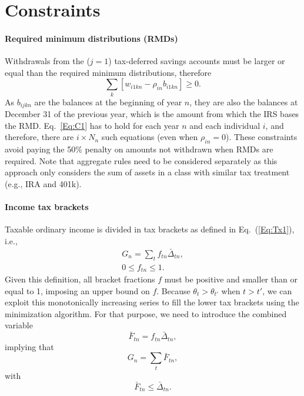 \documentclass{article}[fleqn,12pt]
\begin{document}
\section{Constraints}
\paragraph*{Required minimum distributions (RMDs)}
	Withdrawals from the ($j=1$) tax-deferred savings accounts must be larger
	or equal than the required minimum distributions, therefore
	\begin{equation}
		\label{Eq:C1}
		\sum_k [w_{i1kn} -  \rho_{in}b_{i1kn}] \geq 0.
	\end{equation}
	As $b_{ijkn}$ are the balances at the beginning of year $n$, they are also the balances
	at December 31 of the previous year, which is the amount from which the IRS bases the RMD.
	Eq.~\ref{Eq:C1} has to hold for each year $n$ and each individual $i$, and therefore, there
	are $i\times N_n$ such equations (even when $\rho_{in} = 0$).
	These constraints avoid paying the 50\% penalty
	on amounts not withdrawn when RMDs are required.
	Note that aggregate rules need to be considered separately as this approach only considers
	the sum of assets in a class with similar tax treatment (e.g., IRA and 401k).

\paragraph*{Income tax brackets}
	Taxable ordinary income is divided in tax brackets as defined in Eq.~(\ref{Eq:Tx1}), i.e.,
	\begin{eqnarray}
		\label{Eq:C2}
		G_n = \sum_t f_{tn}\bar{\Delta}_{tn} ,\nonumber\\
		0 \leq f_{tn} \leq 1.
	\end{eqnarray}
	Given this definition, all bracket fractions $f$ must be positive and smaller than or equal to 1,
	imposing an upper bound on $f$.
	Because $\theta_{t} > \theta_{t'}$ when $t > t'$, we can exploit
	this monotonically increasing series to fill the lower
	tax brackets using the minimization algorithm.
	For that purpose, we need to introduce the combined variable
	\begin{equation}
		\bar{F}_{tn} = f_{tn}\bar{\Delta}_{tn},
	\end{equation}
	implying that
	\begin{equation}
		G_n = \sum_t \bar{F}_{tn},
	\end{equation}
	with
	\begin{equation}
		\bar{F}_{tn} \le \bar{\Delta}_{tn}.
	\end{equation}
\end{document}
